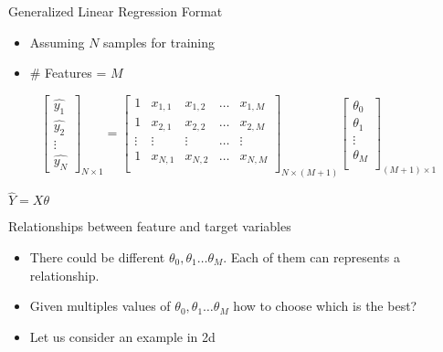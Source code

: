 \documentclass{beamer}
\begin{document}
\begin{frame}{Generalized Linear Regression Format}
\begin{itemize}[<+->]
	\item Assuming $N$ samples for training
	\item \# Features = $M$
\end{itemize}


   \pause \[\begin{bmatrix}
        \hat{y_{1}}\\
        \hat{y_{2}} \\
        \vdots \\
        \hat{y_{N}}
    \end{bmatrix}_{N \times 1}
    =     \begin{bmatrix}
        1 & x_{1,1} & x_{1,2} & \dots & x_{1,M}\\
        1 & x_{2,1} & x_{2,2} & \dots & x_{2,M}\\
        \vdots & \vdots & \vdots & \dots & \vdots\\
        1 & x_{N,1} & x_{N,2} & \dots & x_{N,M}\\
    \end{bmatrix}_{N \times (M+1)}
    \begin{bmatrix}
        \theta_{0}\\
        \theta_{1}\\
        \vdots \\
        \theta_{M}\\
    \end{bmatrix}_{(M+1)\times 1}
   \]
   
   
  \pause  \begin{tcolorbox}
   \begin{center}
       
   

   $ \hat{Y} = X\theta$
   \end{center}
   \end{tcolorbox}

   
\end{frame}


\begin{frame}{Relationships between feature and target variables}
    \begin{itemize}
    	\item  There could be different $\theta_{0}, \theta_{1} \dots \theta_{M}$. Each of them can represents a relationship.
    	\item  Given multiples values of $\theta_{0}, \theta_{1} \dots \theta_{M}$ how to choose which is the  best?
    	\item Let us consider an example in 2d
    \end{itemize}
   
    
   
    
\end{frame}
\end{document}
